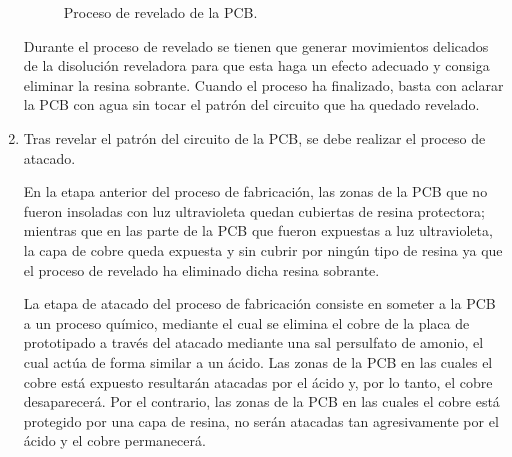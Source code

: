 \begin{enumerate}
    \begin{figure}[H]
    \centering
    \caption{Proceso de revelado de la \ac{PCB}.}
    \end{figure}
    
    Durante el proceso de revelado se tienen que generar movimientos delicados de la disolución reveladora para que esta haga un efecto adecuado y consiga eliminar la resina sobrante. Cuando el proceso ha finalizado, basta con aclarar la \ac{PCB} con agua sin tocar el patrón del circuito que ha quedado revelado.
    
    \item Tras revelar el patrón del circuito de la \ac{PCB}, se debe realizar el proceso de atacado.
    
   En la etapa anterior del proceso de fabricación, las zonas de la \ac{PCB} que no fueron insoladas con luz ultravioleta quedan cubiertas de resina protectora; mientras que en las parte de la \ac{PCB} que fueron expuestas a luz ultravioleta, la capa de cobre queda expuesta y sin cubrir por ningún tipo de resina ya que el proceso de revelado ha eliminado dicha resina sobrante.
   
   La etapa de atacado del proceso de fabricación consiste en someter a la \ac{PCB} a un proceso químico, mediante el cual se elimina el cobre de la placa de prototipado a través del atacado mediante una sal persulfato de amonio, el cual actúa de forma similar a un ácido. Las zonas de la \ac{PCB} en las cuales el cobre está expuesto resultarán atacadas por el ácido y, por lo tanto, el cobre desaparecerá. Por el contrario, las zonas de la \ac{PCB} en las cuales el cobre está protegido por una capa de resina, no serán atacadas tan agresivamente por el ácido y el cobre permanecerá.
   

\end{enumerate}
